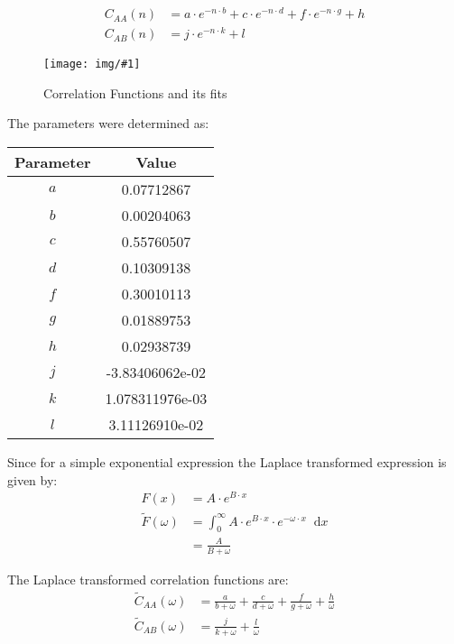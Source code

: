 \documentclass[a4paper, parskip=half]{scrartcl}
\newcommand{\myImage}[2]{
	\begin{figure}[ht!]
	\centering
	\texttt{[image: img/\#1]}
	\caption{#2}
	\label{pic:#1}
	\end{figure}
}
\newcommand{\diff}{\mathop{}\!\mathrm{d}}
\begin{document}
\begin{align}
C_{AA}(n) &= a \cdot e^{- n \cdot b} + c \cdot e^{- n \cdot d} + f \cdot e^{-n \cdot g} + h\\
C_{AB}(n) &= j \cdot e^{- n \cdot k} + l
\end{align}

\myImage{caa_cab}{Correlation Functions and its fits}

The parameters were determined as:
\begin{center}
\begin{tabular}{c|c}
Parameter & Value \\\hline
$a$ & 0.07712867\\
$b$ & 0.00204063\\
$c$ & 0.55760507\\
$d$ & 0.10309138\\
$f$ & 0.30010113\\
$g$ & 0.01889753\\
$h$ & 0.02938739\\
$j$ & -3.83406062e-02\\
$k$ & 1.078311976e-03\\
$l$ & 3.11126910e-02
\end{tabular}
\end{center}

Since for a simple exponential expression the Laplace transformed expression is given by:
\begin{align}
F(x) &= A \cdot e^{B\cdot x} \\
\widetilde{F}(\omega) &= \int_0^\infty A \cdot e^{B\cdot x} \cdot e^{-\omega\cdot x}\diff x \\
&= \frac{A}{B + \omega}
\end{align}

The Laplace transformed correlation functions are:
\begin{align}
\widetilde{C}_{AA}(\omega) &= \frac{a}{b + \omega} + \frac{c}{d + \omega} + \frac{f}{g + \omega} + \frac{h}{\omega} \\
\widetilde{C}_{AB}(\omega) &= \frac{j}{k + \omega} + \frac{l}{\omega}
\end{align}
\end{document}
